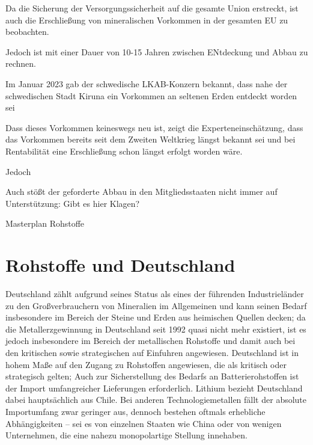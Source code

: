 \documentclass[12pt,a4paper,oneside]{book} %
\begin{document}
Da die Sicherung der Versorgungssicherheit auf die gesamte Union erstreckt, ist auch die Erschließung von mineralischen Vorkommen in der gesamten EU zu beobachten.	

Jedoch ist mit einer Dauer von 10-15 Jahren zwischen ENtdeckung und Abbau zu rechnen.


Im Januar 2023 gab der schwedische LKAB-Konzern bekannt, dass nahe der schwedischen Stadt Kiruna ein Vorkommen an seltenen Erden entdeckt worden sei 

Dass dieses Vorkommen keineswegs neu ist, zeigt die Experteneinschätzung, dass das Vorkommen bereits seit dem Zweiten Weltkrieg längst bekannt sei und bei Rentabilität eine Erschließung schon längst erfolgt worden wäre.\autocite{VDi Nachrichten: Seltene Erden: Deutschland importiert lieber, als selbst zu fördern}


Jedoch 

Auch stößt der geforderte Abbau in den Mitgliedsstaaten nicht immer auf Unterstützung: Gibt es hier Klagen?



Masterplan Rohstoffe

\section{Rohstoffe und Deutschland}

Deutschland zählt aufgrund seines Status als eines der führenden Industrieländer zu den Großverbrauchern von Mineralien im Allgemeinen und kann seinen Bedarf insbesondere im Bereich der Steine und Erden aus heimischen Quellen decken; da die Metallerzgewinnung in Deutschland seit 1992 quasi nicht mehr existiert, ist es jedoch insbesondere im Bereich der metallischen Rohstoffe und damit auch bei den kritischen sowie strategischen auf Einfuhren angewiesen. \autocites{Bericht zur Rohstoffsituation in Deutschland 2023, S. 10ff.}{	Commodity TopNews 73, S. 3} Deutschland ist in hohem Maße auf den Zugang zu Rohstoffen angewiesen, die als kritisch oder strategisch gelten; Auch zur Sicherstellung des Bedarfs an Batterierohstoffen ist der Import umfangreicher Lieferungen erforderlich. Lithium bezieht Deutschland dabei hauptsächlich aus Chile. Bei anderen Technologiemetallen fällt der absolute Importumfang zwar geringer aus, dennoch bestehen oftmals erhebliche Abhängigkeiten – sei es von einzelnen Staaten wie China oder von wenigen Unternehmen, die eine nahezu monopolartige Stellung innehaben.
\end{document}
